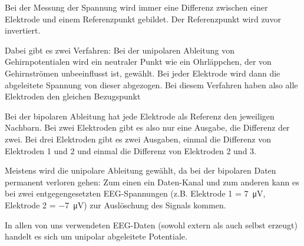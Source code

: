 \documentclass[10pt]{article}
\begin{document}
Bei der Messung der Spannung wird immer eine Differenz zwischen einer Elektrode und einem Referenzpunkt gebildet.
Der Referenzpunkt wird zuvor invertiert.

Dabei gibt es zwei Verfahren: Bei der unipolaren Ableitung von Gehirnpotentialen wird ein neutraler Punkt wie ein Ohrläppchen, der von Gehirnströmen unbeeinflusst ist, gewählt. 
Bei jeder Elektrode wird dann die abgeleitete Spannung von dieser abgezogen.
Bei diesem Verfahren haben also alle Elektroden den gleichen Bezugspunkt

Bei der bipolaren Ableitung hat jede Elektrode als Referenz den jeweiligen Nachbarn.
Bei zwei Elektroden gibt es also nur eine Ausgabe, die Differenz der zwei.
Bei drei Elektroden gibt es zwei Ausgaben, einmal die Differenz von Elektroden 1 und 2 und einmal die Differenz von Elektroden 2 und 3. \cite{EEGHausarbeit}

Meistens wird die unipolare Ableitung gewählt, da bei der bipolaren Daten permanent verloren gehen: Zum einen ein Daten-Kanal und zum anderen kann es bei zwei entgegengesetzten EEG-Spannungen (z.B. Elektrode 1 = \SI{7}{\micro\volt}, Elektrode 2 = \SI{-7}{\micro\volt}) zur Auslöschung des Signals kommen. \cite{EEGHausarbeit}

In allen von uns verwendeten EEG-Daten (sowohl extern als auch selbst erzeugt) handelt es sich um unipolar abgeleitete Potentiale.


\end{document}

